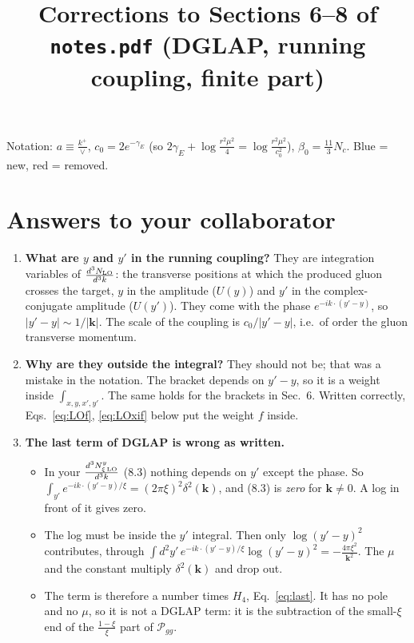 \documentclass[10pt]{article}
\title{Corrections to Sections 6--8 of \texttt{notes.pdf} (DGLAP, running coupling, finite part)}
\date{}
\numberwithin{equation}{section}
\newcommand{\new}[1]{{\color{blue}#1}}
\newcommand{\old}[1]{{\color{red}#1}}
\begin{document}
\maketitle
\noindent Notation: $a\equiv\frac{k^+}{\vee}$, $c_0=2e^{-\gamma_E}$ (so $2\gamma_E+\log\frac{r^2\mu^2}{4}=\log\frac{r^2\mu^2}{c_0^2}$), $\beta_0=\frac{11}{3}N_c$. \new{Blue} = new, \old{red} = removed.

\section{Answers to your collaborator}
\begin{enumerate}
\item \textbf{What are $y$ and $y'$ in the running coupling?} They are integration variables of $\frac{d^3N_{\rm LO}}{d^3k}$: the transverse positions at which the produced gluon crosses the target, $y$ in the amplitude ($U(y)$) and $y'$ in the complex-conjugate amplitude ($U(y')$). They come with the phase $e^{-ik\cdot(y'-y)}$, so $|y'-y|\sim1/|\mathbf k|$. The scale of the coupling is $c_0/|y'-y|$, i.e.\ of order the gluon transverse momentum.
\item \textbf{Why are they outside the integral?} They should not be; that was a mistake in the notation. The bracket depends on $y'-y$, so it is a weight inside $\int_{x,y,x',y'}$. The same holds for the brackets in Sec.~6. Written correctly, Eqs.~\eqref{eq:LOf}, \eqref{eq:LOxif} below put the weight $f$ inside.
\item \textbf{The last term of DGLAP is wrong as written.}
\begin{itemize}
\item In your $\frac{d^3N^y_{\xi\,\rm LO}}{d^3k}$ (8.3) nothing depends on $y'$ except the phase. So $\int_{y'}e^{-ik\cdot(y'-y)/\xi}=(2\pi\xi)^2\delta^2(\mathbf k)$, and (8.3) is \emph{zero} for $\mathbf k\neq0$. A log in front of it gives zero.
\item The log must be inside the $y'$ integral. Then only $\log(y'-y)^2$ contributes, through $\int d^2y'\,e^{-ik\cdot(y'-y)/\xi}\log(y'-y)^2=-\frac{4\pi\xi^2}{\mathbf k^2}$. The $\mu$ and the constant multiply $\delta^2(\mathbf k)$ and drop out.
\item The term is therefore a number times $H_4$, Eq.~\eqref{eq:last}. It has no pole and no $\mu$, so it is not a DGLAP term: it is the subtraction of the small-$\xi$ end of the $\frac{1-\xi}{\xi}$ part of $\mathcal P_{gg}$.
\end{itemize}
\end{enumerate}
\end{document}
